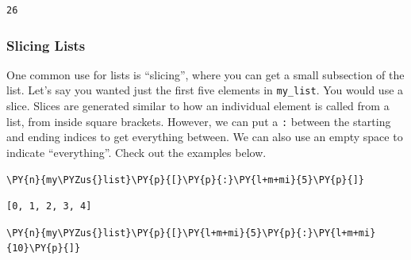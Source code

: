             \begin{tcolorbox}[breakable, size=fbox, boxrule=.5pt, pad at break*=1mm, opacityfill=0]
\begin{Verbatim}[commandchars=\\\{\}]
26
\end{Verbatim}
\end{tcolorbox}
        
    \hypertarget{slicing-lists}{%
\subsubsection{Slicing Lists}\label{slicing-lists}}

One common use for lists is ``slicing'', where you can get a small
subsection of the list. Let's say you wanted just the first five
elements in \texttt{my\_list}. You would use a slice. Slices are
generated similar to how an individual element is called from a list,
from inside square brackets. However, we can put a \texttt{:} between
the starting and ending indices to get everything between. We can also
use an empty space to indicate ``everything''. Check out the examples
below.

    \begin{tcolorbox}[breakable, size=fbox, boxrule=1pt, pad at break*=1mm,colback=cellbackground, colframe=cellborder]
\begin{Verbatim}[commandchars=\\\{\}]
\PY{n}{my\PYZus{}list}\PY{p}{[}\PY{p}{:}\PY{l+m+mi}{5}\PY{p}{]}
\end{Verbatim}
\end{tcolorbox}

            \begin{tcolorbox}[breakable, size=fbox, boxrule=.5pt, pad at break*=1mm, opacityfill=0]
\begin{Verbatim}[commandchars=\\\{\}]
[0, 1, 2, 3, 4]
\end{Verbatim}
\end{tcolorbox}
        
    \begin{tcolorbox}[breakable, size=fbox, boxrule=1pt, pad at break*=1mm,colback=cellbackground, colframe=cellborder]
\begin{Verbatim}[commandchars=\\\{\}]
\PY{n}{my\PYZus{}list}\PY{p}{[}\PY{l+m+mi}{5}\PY{p}{:}\PY{l+m+mi}{10}\PY{p}{]}
\end{Verbatim}
\end{tcolorbox}

